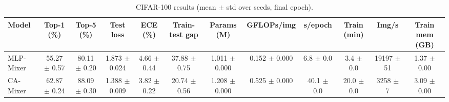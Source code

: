 \begin{table}[t]\centering\small
\caption{CIFAR-100 results (mean $\pm$ std over seeds, final epoch).}
\begin{tabular}{lccccccccccc}
\toprule
Model & Top-1 (\%) & Top-5 (\%) & Test loss & ECE (\%) & Train-test gap & Params (M) & GFLOPs/img & s/epoch & Train (min) & Img/s & Train mem (GB) \\
\midrule
MLP-Mixer & 55.27 $\pm$ 0.57 & 80.11 $\pm$ 0.20 & 1.873 $\pm$ 0.024 & 4.66 $\pm$ 0.44 & 37.88 $\pm$ 0.75 & 1.011 $\pm$ 0.000 & 0.152 $\pm$ 0.000 & 6.8 $\pm$ 0.0 & 3.4 $\pm$ 0.0 & 19197 $\pm$ 51 & 1.37 $\pm$ 0.00 \\
CA-Mixer & 62.87 $\pm$ 0.24 & 88.09 $\pm$ 0.30 & 1.388 $\pm$ 0.009 & 3.82 $\pm$ 0.22 & 20.74 $\pm$ 0.56 & 1.208 $\pm$ 0.000 & 0.525 $\pm$ 0.000 & 40.1 $\pm$ 0.0 & 20.0 $\pm$ 0.0 & 3258 $\pm$ 7 & 3.09 $\pm$ 0.00 \\
\bottomrule
\end{tabular}
\end{table}